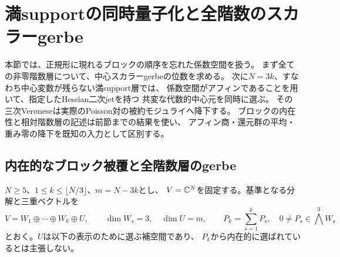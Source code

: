 \section{満supportの同時量子化と全階数のスカラーgerbe}
\label{sec:pg-full-support-quantization}

本節では、正規形に現れるブロックの順序を忘れた係数空間を扱う。
まず全ての非零階数層について、中心スカラーgerbeの位数を求める。
次に$N=3k$、すなわち中心変数が残らない満support層では、
係数空間がアフィンであることを用いて、指定したHessian二次jetを持つ
共変な代数的中心元を同時に選ぶ。
その三次Veroneseは実際のPoisson対の被約モジュライへ降下する。
ブロックの内在性と相対階数層の記述は前節までの結果を使い、
アフィン商・還元群の平均・重み零の降下を既知の入力として区別する。

\subsection{内在的なブロック被覆と全階数層のgerbe}

$N\ge5$、$1\le k\le\lfloor N/3\rfloor$、$m=N-3k$とし、
$V=\mathbb C^N$を固定する。基準となる分解と三重ベクトルを
\begin{equation}
 V=W_1\oplus\cdots\oplus W_k\oplus U,\qquad
 \dim W_s=3,\quad\dim U=m,\qquad
 P_k=\sum_{s=1}^kP_s,\quad
 0\ne P_s\in\bigwedge^3W_s
 \label{eq:pg-intrinsic-multiblock-reference}
\end{equation}
とおく。$U$は以下の表示のために選ぶ補空間であり、
$P_k$から内在的に選ばれているとは主張しない。

